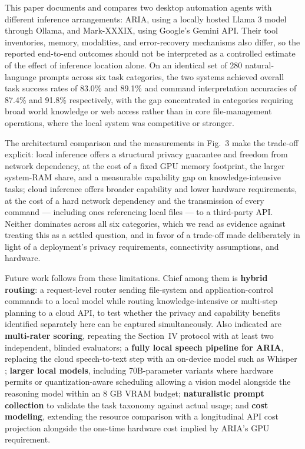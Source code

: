 \documentclass[conference]{IEEEtran}
\begin{document}
This paper documents and compares two desktop automation agents with different inference arrangements: ARIA, using a locally hosted Llama 3 model through Ollama, and Mark-XXXIX, using Google's Gemini API. Their tool inventories, memory, modalities, and error-recovery mechanisms also differ, so the reported end-to-end outcomes should not be interpreted as a controlled estimate of the effect of inference location alone. On an identical set of 280 natural-language prompts across six task categories, the two systems achieved overall task success rates of 83.0\% and 89.1\% and command interpretation accuracies of 87.4\% and 91.8\% respectively, with the gap concentrated in categories requiring broad world knowledge or web access rather than in core file-management operations, where the local system was competitive or stronger.

The architectural comparison and the measurements in Fig.~3 make the trade-off explicit: local inference offers a structural privacy guarantee and freedom from network dependency, at the cost of a fixed GPU memory footprint, the larger system-RAM share, and a measurable capability gap on knowledge-intensive tasks; cloud inference offers broader capability and lower hardware requirements, at the cost of a hard network dependency and the transmission of every command --- including ones referencing local files --- to a third-party API. Neither dominates across all six categories, which we read as evidence against treating this as a settled question, and in favor of a trade-off made deliberately in light of a deployment's privacy requirements, connectivity assumptions, and hardware.

Future work follows from these limitations. Chief among them is \textbf{hybrid routing}: a request-level router sending file-system and application-control commands to a local model while routing knowledge-intensive or multi-step planning to a cloud API, to test whether the privacy and capability benefits identified separately here can be captured simultaneously. Also indicated are \textbf{multi-rater scoring}, repeating the Section~IV protocol with at least two independent, blinded evaluators; a \textbf{fully local speech pipeline for ARIA}, replacing the cloud speech-to-text step with an on-device model such as Whisper \cite{ref13}; \textbf{larger local models}, including 70B-parameter variants where hardware permits or quantization-aware scheduling \cite{ref20} allowing a vision model alongside the reasoning model within an 8 GB VRAM budget; \textbf{naturalistic prompt collection} to validate the task taxonomy against actual usage; and \textbf{cost modeling}, extending the resource comparison with a longitudinal API cost projection alongside the one-time hardware cost implied by ARIA's GPU requirement.
\end{document}
